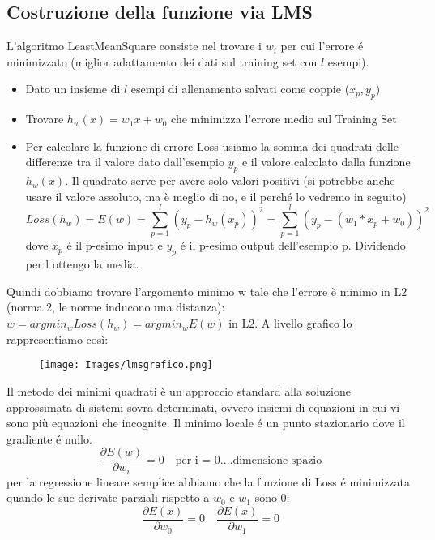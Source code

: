 \documentclass{article}
\begin{document}
\subsection{Costruzione della funzione via LMS}
L'algoritmo LeastMeanSquare consiste nel trovare i $w_i$ per cui l'errore é minimizzato (miglior adattamento dei dati sul training set con $l$ esempi).
\begin{itemize}
    \item Dato un insieme di $l$ esempi di allenamento salvati come coppie ($x_p,y_p$)
    \item Trovare $h_w(x)=w_1x+w_0$ che minimizza l'errore medio sul Training Set
    \item Per calcolare la funzione di errore Loss usiamo la somma dei quadrati delle differenze tra il valore dato dall'esempio $y_p$ e il valore calcolato dalla funzione $h_w(x)$. Il quadrato serve per avere solo valori positivi (si potrebbe anche usare il valore assoluto, ma è meglio di no, e il perché lo vedremo in seguito)
    \begin{equation}
        Loss(h_w) = E(w) = \sum_{p = 1}^l (y_p - h_w(x_p))^2 = \sum_{p = 1}^l (y_p - (w_1*x_p + w_0))^2
    \end{equation} 
    dove $x_p$ é il p-esimo input e $y_p$ é il p-esimo output dell'esempio p. Dividendo per l ottengo la media.
\end{itemize}
Quindi dobbiamo trovare l'argomento minimo w tale che l'errore è minimo in L2 (norma 2, le norme inducono una distanza): $w = argmin_wLoss(h_w) = argmin_wE(w) \text{ in L2}$. A livello grafico lo rappresentiamo così: 
\begin{figure}[H]
    \centering
    \texttt{[image: Images/lmsgrafico.png]}
\end{figure}
Il metodo dei minimi quadrati è un approccio standard alla soluzione approssimata di sistemi sovra-determinati, ovvero insiemi di equazioni in cui vi sono più equazioni che incognite. \newline
Il minimo locale é un punto stazionario dove il gradiente é nullo.
\begin{equation}
    \frac{\partial E(w)}{\partial w_i} = 0 \quad \text{per i = 0....dimensione\_spazio}
\end{equation}
per la regressione lineare semplice abbiamo che la funzione di Loss é minimizzata quando le sue derivate parziali rispetto a $w_0$ e $w_1$ sono 0:
\begin{equation}
    \frac{\partial E(x)}{\partial w_0} = 0 \quad \frac{\partial E(x)}{\partial w_1} = 0
\end{equation}
\end{document}
